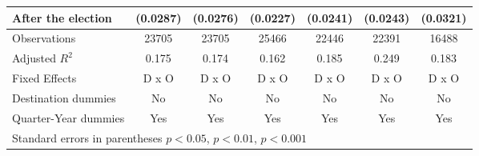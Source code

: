 \begin{table}[htbp]
\begin{tabular}{l*{6}{c}}
After the election                    &    (0.0287)         &    (0.0276)         &    (0.0227)         &    (0.0241)         &    (0.0243)         &    (0.0321)         \\
\hline
Observations        &       23705         &       23705         &       25466         &       22446         &       22391         &       16488         \\
Adjusted \(R^{2}\)  &       0.175         &       0.174         &       0.162         &       0.185         &       0.249         &       0.183         \\
Fixed Effects       &       D x O         &       D x O         &       D x O         &       D x O         &       D x O         &       D x O         \\
Destination dummies &          No         &          No         &          No         &          No         &          No         &          No         \\
Quarter-Year dummies&         Yes         &         Yes         &         Yes         &         Yes         &         Yes         &         Yes         \\
\hline\hline
\multicolumn{7}{l}{ Standard errors in parentheses \sym{*} \(p<0.05\), \sym{**} \(p<0.01\), \sym{***} \(p<0.001\)}\\
\end{tabular}
\end{table}

